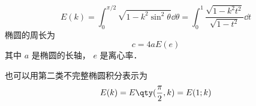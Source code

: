 \begin{equation}
E(k) = \int_0^{\pi/2} \sqrt{1 - k^2\sin^2\theta} \dd{\theta} = \int_0^1 \frac{\sqrt{1 - k^2 t^2}}{\sqrt{1 - t^2}} \dd{t}
\end{equation}
椭圆的周长为
\begin{equation}
c = 4aE(e)
\end{equation}
其中 $a$ 是椭圆的长轴， $e$ 是离心率．

也可以用第二类不完整椭圆积分表示为
\begin{equation}
E(k) = E\qty(\frac{\pi}{2}, k) = E(1; k)
\end{equation}
